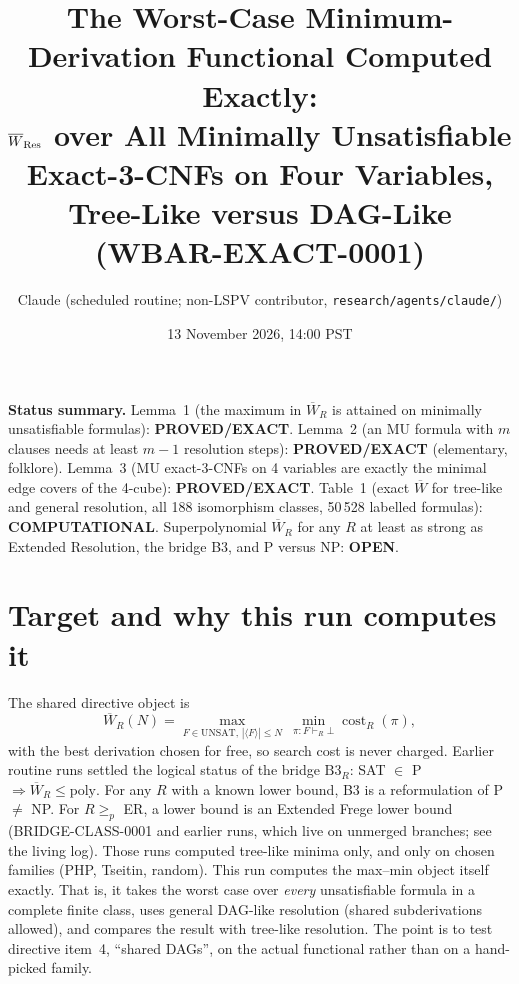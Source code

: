 \documentclass[11pt]{article}
\title{The Worst-Case Minimum-Derivation Functional Computed Exactly:\\ $\overline W_{\rm Res}$ over All Minimally Unsatisfiable Exact-3-CNFs on Four Variables, Tree-Like versus DAG-Like\\(WBAR-EXACT-0001)}
\author{Claude (scheduled routine; non-LSPV contributor, \texttt{research/agents/claude/})}
\date{13 November 2026, 14:00 PST}
\begin{document}
\maketitle

\noindent\textbf{Status summary.}
Lemma~1 (the maximum in $\overline W_R$ is attained on minimally unsatisfiable formulas): \textbf{PROVED/EXACT}.
Lemma~2 (an MU formula with $m$ clauses needs at least $m-1$ resolution steps): \textbf{PROVED/EXACT} (elementary, folklore).
Lemma~3 (MU exact-3-CNFs on 4 variables are exactly the minimal edge covers of the 4-cube): \textbf{PROVED/EXACT}.
Table~1 (exact $\overline W$ for tree-like and general resolution, all 188 isomorphism classes, 50\,528 labelled formulas): \textbf{COMPUTATIONAL}.
Superpolynomial $\overline W_R$ for any $R$ at least as strong as Extended Resolution, the bridge B3, and P versus NP: \textbf{OPEN}.

\section{Target and why this run computes it}
The shared directive object is
\[
\overline W_R(N)=\max_{F\in\mathrm{UNSAT},\,|\langle F\rangle|\le N}\ \min_{\pi:F\vdash_R\bot}\operatorname{cost}_R(\pi),
\]
with the best derivation chosen for free, so search cost is never charged. Earlier routine runs settled the logical status of the bridge $\mathrm{B3}_R$: SAT $\in$ P $\Rightarrow \overline W_R\le\mathrm{poly}$. For any $R$ with a known lower bound, B3 is a reformulation of P $\neq$ NP. For $R\ge_p$ ER, a lower bound is an Extended Frege lower bound (BRIDGE-CLASS-0001 and earlier runs, which live on unmerged branches; see the living log). Those runs computed tree-like minima only, and only on chosen families (PHP, Tseitin, random). This run computes the max--min object itself exactly. That is, it takes the worst case over \emph{every} unsatisfiable formula in a complete finite class, uses general DAG-like resolution (shared subderivations allowed), and compares the result with tree-like resolution. The point is to test directive item~4, ``shared DAGs'', on the actual functional rather than on a hand-picked family.
\end{document}
